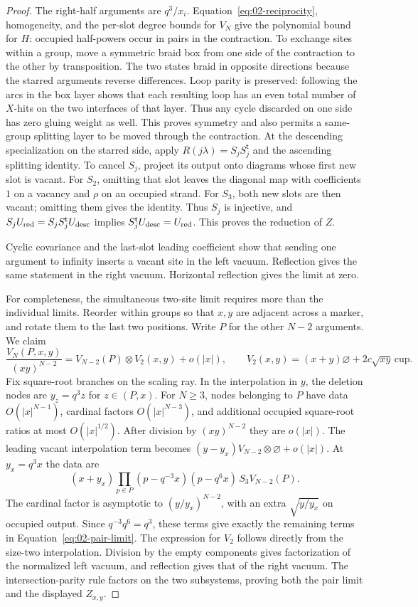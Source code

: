 \begin{proof}
The right-half arguments are $q^3/x_i$. Equation~\eqref{eq:02-reciprocity},
homogeneity, and the per-slot degree bounds for $V_N$ give the
polynomial bound for $H$: occupied half-powers occur in pairs in the
contraction. To exchange sites within a group, move a symmetric braid
box from one side of the contraction to the other by transposition.
The two states braid in opposite directions because the starred
arguments reverse differences. Loop parity is preserved: following
the arcs in the box layer shows that each resulting loop has an even
total number of $X$-hits on the two interfaces of that layer. Thus
any cycle discarded on one side has zero gluing weight as well.
This proves symmetry and also permits a same-group splitting layer
to be moved through the contraction. At the descending specialization
on the starred side, apply $R(j\lambda)=S_jS_j^{\mathsf t}$ and the
ascending splitting identity. To cancel $S_j$, project its output onto diagrams whose first new
slot is vacant. For $S_2$, omitting that slot leaves the diagonal map
with coefficients $1$ on a vacancy and $\rho$ on an occupied strand.
For $S_3$, both new slots are then vacant; omitting them gives the
identity. Thus $S_j$ is injective, and
$S_jU_{\rm red}=S_jS_j^{\mathsf t}U_{\rm desc}$ implies
$S_j^{\mathsf t}U_{\rm desc}=U_{\rm red}$. This proves
the reduction of $Z$.

Cyclic covariance and the last-slot leading coefficient show that
sending one argument to infinity inserts a vacant site in the left
vacuum. Reflection gives the same statement in the right vacuum.
Horizontal reflection gives the limit at zero.

For completeness, the simultaneous two-site limit requires more than
the individual limits. Reorder within groups so that $x,y$ are adjacent
across a marker, and rotate them to the last two positions. Write
$P$ for the other $N-2$ arguments. We claim
\begin{equation}\label{eq:02-pair-limit}
 \frac{V_N(P,x,y)}{(xy)^{N-2}}
 =V_{N-2}(P)\otimes V_2(x,y)+o(|x|),
 \qquad
 V_2(x,y)=(x+y)\varnothing+2c\sqrt{xy}\,\mathrm{cup}.
\end{equation}
Fix square-root branches on the scaling ray. In the interpolation in
$y$, the deletion nodes are $y_z=q^3z$ for $z\in(P,x)$. For $N\ge3$,
nodes belonging to $P$ have data $O(|x|^{N-1})$, cardinal factors
$O(|x|^{N-3})$, and additional occupied square-root ratios at most
$O(|x|^{1/2})$. After division by $(xy)^{N-2}$ they are $o(|x|)$.
The leading vacant interpolation term becomes
$(y-y_x)V_{N-2}\otimes\varnothing+o(|x|)$. At $y_x=q^3x$ the data are
\[
 (x+y_x)\prod_{p\in P}(p-q^{-3}x)(p-q^6x)\,S_3V_{N-2}(P).
\]
The cardinal factor is asymptotic to $(y/y_x)^{N-2}$, with an extra
$\sqrt{y/y_x}$ on occupied output. Since $q^{-3}q^6=q^3$, these
terms give exactly the remaining terms in Equation~\eqref{eq:02-pair-limit}.
The expression for $V_2$ follows directly from the size-two
interpolation. Division by the empty components gives factorization
of the normalized left vacuum, and reflection gives that of the
right vacuum. The intersection-parity rule factors on the two
subsystems, proving both the pair limit and the displayed $Z_{x,y}$.


\end{proof}
